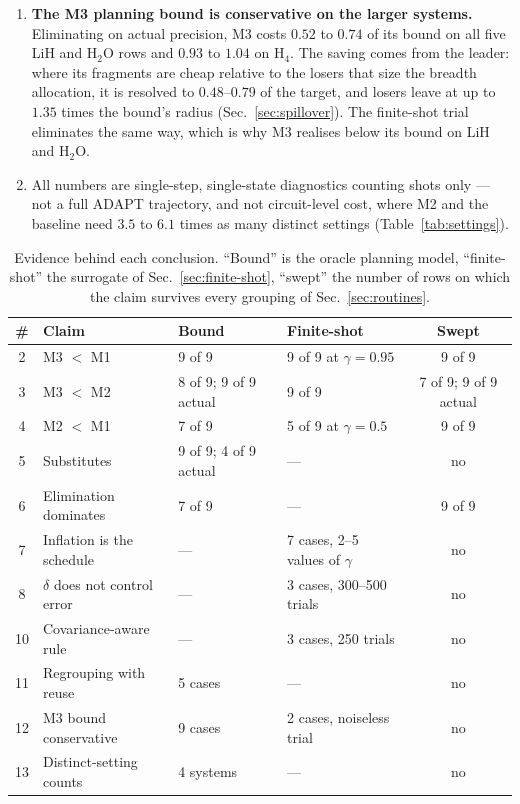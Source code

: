 \documentclass[10pt]{article}
\begin{document}
\begin{enumerate}[leftmargin=2em]
  \item \textbf{The M3 planning bound is conservative on the larger systems.} Eliminating on actual precision, M3 costs $0.52$ to $0.74$ of its bound on all five LiH and H$_2$O rows and $0.93$ to $1.04$ on H$_4$. The saving comes from the leader: where its fragments are cheap relative to the losers that size the breadth allocation, it is resolved to $0.48$--$0.79$ of the target, and losers leave at up to $1.35$ times the bound's radius (Sec.~\ref{sec:spillover}). The finite-shot trial eliminates the same way, which is why M3 realises below its bound on LiH and H$_2$O.
  \item All numbers are single-step, single-state diagnostics counting shots only --- not a full ADAPT trajectory, and not circuit-level cost, where M2 and the baseline need $3.5$ to $6.1$ times as many distinct settings (Table~\ref{tab:settings}).
\end{enumerate}

\begin{table}[!htbp]
\centering
\scriptsize
\caption{Evidence behind each conclusion. ``Bound'' is the oracle planning model, ``finite-shot'' the surrogate of Sec.~\ref{sec:finite-shot}, ``swept'' the number of rows on which the claim survives every grouping of Sec.~\ref{sec:routines}.}
\label{tab:evidence}
\begin{tabular}{clllc}
\toprule
\# & Claim & Bound & Finite-shot & Swept \\
\midrule
2  & M3 $<$ M1                        & 9 of 9  & 9 of 9 at $\gamma=0.95$ & 9 of 9 \\
3  & M3 $<$ M2                        & 8 of 9; 9 of 9 actual & 9 of 9 & 7 of 9; 9 of 9 actual \\
4  & M2 $<$ M1                        & 7 of 9  & 5 of 9 at $\gamma=0.5$ & 9 of 9 \\
5  & Substitutes                      & 9 of 9; 4 of 9 actual & ---    & no \\
6  & Elimination dominates            & 7 of 9  & ---    & 9 of 9 \\
7  & Inflation is the schedule        & ---     & 7 cases, 2--5 values of $\gamma$ & no \\
8  & $\delta$ does not control error  & ---     & 3 cases, 300--500 trials & no \\
10 & Covariance-aware rule            & ---     & 3 cases, 250 trials & no \\
11 & Regrouping with reuse            & 5 cases & ---    & no \\
12 & M3 bound conservative            & 9 cases & 2 cases, noiseless trial & no \\
13 & Distinct-setting counts          & 4 systems & ---  & no \\
\bottomrule
\end{tabular}
\end{table}
\end{document}
